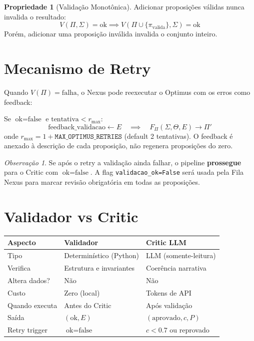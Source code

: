 \documentclass[a4paper, 12pt]{report}
\theoremstyle{definition}
\newtheorem{propriedade}{Propriedade}[chapter]
\theoremstyle{remark}
\newtheorem{observacao}{Observa\c{c}\~ao}[chapter]
\begin{document}
\begin{propriedade}[Valida\c{c}\~ao Monot\^onica]
  Adicionar proposi\c{c}\~oes v\'alidas nunca invalida o resultado:
  \[
    V(\Pi, \Sigma) = \text{ok} \implies V(\Pi \cup \{\pi_{\text{valida}}\}, \Sigma) = \text{ok}
  \]
  Por\'em, adicionar uma proposi\c{c}\~ao inv\'alida invalida o conjunto inteiro.
\end{propriedade}


\section{Mecanismo de Retry}

Quando $V(\Pi) = \text{falha}$, o Nexus pode reexecutar o Optimus
com os erros como feedback:

\begin{caixaguardrail}
  Se $\text{ok} = \text{false}$ e $\text{tentativa} < r_{\max}$:
  \[
    \text{feedback\_validacao} \gets E
    \quad \implies \quad
    F_{\Pi}(\Sigma, \Theta, E) \to \Pi'
  \]
  onde $r_{\max} = 1 + \texttt{MAX\_OPTIMUS\_RETRIES}$ (default 2 tentativas).
  O feedback \'e anexado \`a descri\c{c}\~ao de cada proposi\c{c}\~ao,
  n\~ao regenera proposi\c{c}\~oes do zero.
\end{caixaguardrail}

\begin{observacao}
  Se ap\'os o retry a valida\c{c}\~ao ainda falhar, o pipeline
  \textbf{prossegue} para o Critic com $\text{ok}=\text{false}$.
  A flag \texttt{validacao\_ok=False} ser\'a usada pela Fila Nexus
  para marcar revis\~ao obrigat\'oria em todas as proposi\c{c}\~oes.
\end{observacao}


\section{Validador vs Critic}

\begin{center}
\begin{tabular}{lll}
  \toprule
  \textbf{Aspecto} & \textbf{Validador} & \textbf{Critic LLM} \\
  \midrule
  Tipo & Determin\'istico (Python) & LLM (somente-leitura) \\
  Verifica & Estrutura e invariantes & Coer\^encia narrativa \\
  Altera dados? & N\~ao & N\~ao \\
  Custo & Zero (local) & Tokens de API \\
  Quando executa & Antes do Critic & Ap\'os valida\c{c}\~ao \\
  Sa\'ida & $(\text{ok}, E)$ & $(\text{aprovado}, c, P)$ \\
  Retry trigger & $\text{ok}=\text{false}$ & $c < 0.7$ ou reprovado \\
  \bottomrule
\end{tabular}
\end{center}
\end{document}
